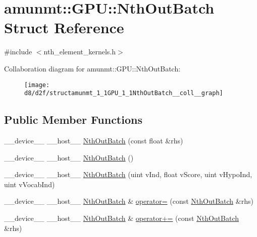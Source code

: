 \hypertarget{structamunmt_1_1GPU_1_1NthOutBatch}{}\section{amunmt\+:\+:G\+PU\+:\+:Nth\+Out\+Batch Struct Reference}
\label{structamunmt_1_1GPU_1_1NthOutBatch}


{\ttfamily \#include $<$nth\+\_\+element\+\_\+kernels.\+h$>$}



Collaboration diagram for amunmt\+:\+:G\+PU\+:\+:Nth\+Out\+Batch\+:
\nopagebreak
\begin{figure}[H]
\begin{center}
\leavevmode
\texttt{[image: d8/d2f/structamunmt\_1\_1GPU\_1\_1NthOutBatch\_\_coll\_\_graph]}
\end{center}
\end{figure}
\subsection*{Public Member Functions}
\begin{DoxyCompactItemize}
\item 
\+\_\+\+\_\+device\+\_\+\+\_\+ \+\_\+\+\_\+host\+\_\+\+\_\+ \hyperlink{structamunmt_1_1GPU_1_1NthOutBatch_aeaaf09393da0594788eb8086c3fa03a1}{Nth\+Out\+Batch} (const float \&rhs)
\item 
\+\_\+\+\_\+device\+\_\+\+\_\+ \+\_\+\+\_\+host\+\_\+\+\_\+ \hyperlink{structamunmt_1_1GPU_1_1NthOutBatch_a6ff60defd3ccdb31907291d2a629af92}{Nth\+Out\+Batch} ()
\item 
\+\_\+\+\_\+device\+\_\+\+\_\+ \+\_\+\+\_\+host\+\_\+\+\_\+ \hyperlink{structamunmt_1_1GPU_1_1NthOutBatch_abf6f0225fbd69c46dab56778e2759272}{Nth\+Out\+Batch} (uint v\+Ind, float v\+Score, uint v\+Hypo\+Ind, uint v\+Vocab\+Ind)
\item 
\+\_\+\+\_\+device\+\_\+\+\_\+ \+\_\+\+\_\+host\+\_\+\+\_\+ \hyperlink{structamunmt_1_1GPU_1_1NthOutBatch}{Nth\+Out\+Batch} \& \hyperlink{structamunmt_1_1GPU_1_1NthOutBatch_a58422699357c6645acd86c1e17cab703}{operator=} (const \hyperlink{structamunmt_1_1GPU_1_1NthOutBatch}{Nth\+Out\+Batch} \&rhs)
\item 
\+\_\+\+\_\+device\+\_\+\+\_\+ \+\_\+\+\_\+host\+\_\+\+\_\+ \hyperlink{structamunmt_1_1GPU_1_1NthOutBatch}{Nth\+Out\+Batch} \& \hyperlink{structamunmt_1_1GPU_1_1NthOutBatch_a67b5fd207727caada80b31cbb8424b12}{operator+=} (const \hyperlink{structamunmt_1_1GPU_1_1NthOutBatch}{Nth\+Out\+Batch} \&rhs)
\end{DoxyCompactItemize}
